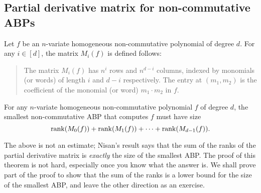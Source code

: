 \subsection{Partial derivative matrix for non-commutative ABPs}

\begin{definition} Let $f$ be an $n$-variate homogeneous non-commutative polynomial of degree $d$. For any $i \in [d]$, the matrix $M_i(f)$ is defined follows:
  \begin{quote}
    The matrix $M_i(f)$ has $n^i$ rows and $n^{d-i}$ columns, indexed by monomials (or words) of length $i$ and $d-i$ respectively. The entry at $(m_1, m_2)$ is the coefficient of the monomial (or word) $m_1 \cdot m_2$ in $f$. \qedhere
  \end{quote}
\end{definition}

\begin{theorem}\label{thm:nis-noncomm-abp}
For any $n$-variate homogeneous non-commutative polynomial $f$ of degree $d$, the smallest non-commutative ABP that computes $f$ must have size
\[
\operatorname{rank}(M_0(f)) + \operatorname{rank}(M_1(f)) +  \cdots + \operatorname{rank}(M_{d-1}(f)).
\]
\end{theorem}
The above is not an estimate; Nisan's result says that the sum of the ranks of the partial derivative matrix is \emph{exactly} the size of the smallest ABP.
The proof of this theorem is not hard, especially once you know what the answer is.
We shall prove part of the proof to show that the sum of the ranks is a lower bound for the size of the smallest ABP, and leave the other direction as an exercise.

